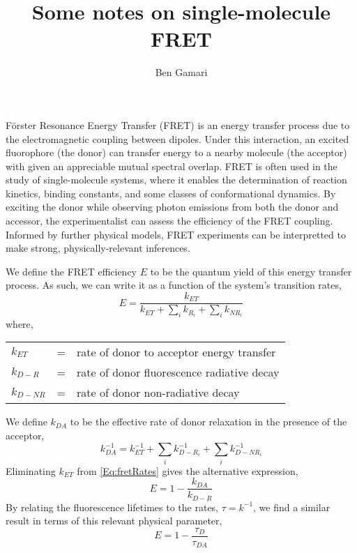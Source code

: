 \documentclass{article}
\title{Some notes on single-molecule FRET}
\author{Ben Gamari}
\begin{document}
\maketitle

F\"orster Resonance Energy Transfer (FRET) is an energy transfer
process due to the electromagnetic coupling between dipoles. Under
this interaction, an excited fluorophore (the donor) can transfer energy
to a nearby molecule (the acceptor) with given an appreciable mutual
spectral overlap. FRET is often used in the study of single-molecule
systems, where it enables the determination of reaction kinetics,
binding constants, and some classes of conformational dynamics.
By exciting the donor while observing photon emissions from both the
donor and accessor, the experimentalist can assess the efficiency of
the FRET coupling. Informed by further physical models, FRET
experiments can be interpretted to make strong, physically-relevant
inferences.

We define the FRET efficiency $E$ to be the quantum yield of this
energy transfer process. As such, we can write it as a function of the
system's transition rates,
\begin{equation}
  E = \frac{k_{ET}}{k_{ET} + \sum_i k_{R_i} + \sum_i k_{NR_i}}
  \label{Eq:fretRates}
\end{equation}
where,

\begin{tabular}{lcl}
  $k_{ET}$  & = & rate of donor to acceptor energy transfer \\
  $k_{D-R}$   & = & rate of donor fluorescence radiative decay \\
  $k_{D-NR}$  & = & rate of donor non-radiative decay \\
\end{tabular}

We define $k_{DA}$ to be the effective rate of donor relaxation in the presence
of the acceptor,
\[ k_{DA}^{-1} = k_{ET}^{-1} + \sum_i k_{D-R_i}^{-1} + \sum_i k_{D-NR_i}^{-1} \]
Eliminating $k_{ET}$ from \eqref{Eq:fretRates} gives the alternative expression,
\begin{equation}
  E = 1 - \frac{k_{DA}}{k_{D-R}} \label{Eq:fretEffRates}
\end{equation}
By relating the fluorescence lifetimes to the rates, $\tau = k^{-1}$,
we find a similar result in terms of this relevant physical parameter,
\begin{equation}
  E = 1 - \frac{\tau_{D}}{\tau_{DA}} \label{Eq:fretEffTau}
\end{equation}
\end{document}
